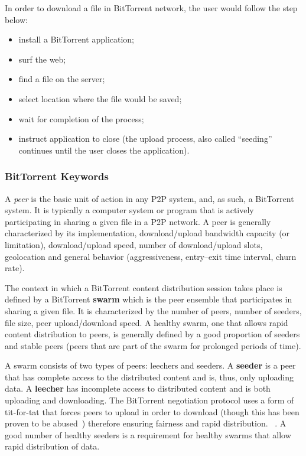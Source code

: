 In order to download a file in BitTorrent network, the user would follow the
step below:

\begin{itemize}
  \item install a BitTorrent application;
  \item surf the web;
  \item find a file on the server;
  \item select location where the file would be saved;
  \item wait for completion of the process;
  \item instruct application to close (the upload process, also called
  ``seeding'' continues until the user closes the application).
\end{itemize}

\subsubsection{BitTorrent Keywords}

A \textit{peer} is the basic unit of action in any P2P system, and, as such, a
BitTorrent system. It is typically a computer system or program that is
actively participating in sharing a given file in a P2P network. A peer is
generally characterized by its implementation, download/upload bandwidth
capacity (or limitation), download/upload speed, number of download/upload
slots, geolocation and general behavior (aggressiveness, entry--exit time
interval, churn rate).

The context in which a BitTorrent content distribution session takes place is
defined by a BitTorrent \textbf{swarm} which is the peer ensemble that
participates in sharing a given file. It is characterized by the number of
peers, number of seeders, file size, peer upload/download speed. A healthy
swarm, one that allows rapid content distribution to peers, is generally
defined by a good proportion of seeders and stable peers (peers that are part
of the swarm for prolonged periods of time).

A swarm consists of two types of peers: leechers and seeders. A
\textbf{seeder} is a peer that has complete access to the distributed content
and is, thus, only uploading data. A \textbf{leecher} has incomplete access to
distributed content and is both uploading and downloading. The BitTorrent
negotiation protocol uses a form of tit-for-tat that forces peers to upload in
order to download (though this has been proven to be
abused~\cite{free-riding}) therefore ensuring fairness and rapid distribution.
~\cite{bt-pef}.
A good number of healthy seeders is a requirement for healthy swarms that
allow rapid distribution of data.

